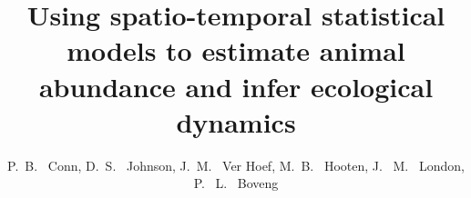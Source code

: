 \documentclass[times,mee,doublespace,]{besauth2}
\begin{document}


\title{Using spatio-temporal statistical models to estimate animal abundance and infer ecological dynamics} %

\author{P.~B. ~Conn\corrauth, D.~S. ~Johnson, J.~M. ~Ver Hoef, M.~B. ~Hooten,  J. ~M. ~London, P. ~L. ~Boveng}


\address{National Marine Mammal Laboratory, Alaska Fisheries Science Center, NOAA National Marine Fisheries Service, 7600 Sand Point Way NE, Seattle, WA 98115 USA;U.S. Geological Survey, Colorado Cooperative Fish and Wildlife Research Unit, Colorado State University, Fort Collins, CO 80523 USA; Department of Fish, Wildlife, and Conservation Biology, Colorado State University, Fort Collins, CO 80523 USA;Department of Statistics, Colorado State University, Fort Collins, CO 80523 USA}

\end{document}
